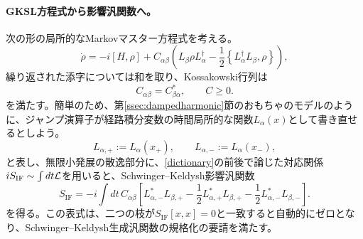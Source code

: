 \documentclass[a4paper,11pt,oneside]{article}
\theoremstyle{definition}
\numberwithin{equation}{section}
\renewcommand{\L}{\mathcal{L}}
\begin{document}
\paragraph{GKSL方程式から影響汎関数へ。}
次の形の局所的なMarkovマスター方程式を考える。
\begin{equation}
\dot{\rho}
=
-i[H,\rho]
+
C_{\alpha\beta}
\left(
L_{\beta}\rho L_{\alpha}^{\dagger}
-
\frac{1}{2}
\left\{
L_{\alpha}^{\dagger}L_{\beta},
\rho
\right\}
\right),
\end{equation}
繰り返された添字については和を取り、Kossakowski行列は
\begin{equation}\label{Cprop}
C_{\alpha\beta}
=
C_{\beta\alpha}^{*},
\qquad
C\geq 0.
\end{equation}
を満たす。簡単のため、第\ref{ssec:dampedharmonic}節のおもちゃのモデルのように、ジャンプ演算子が経路積分変数の時間局所的な関数$L_{\alpha}(x)$として書き直せるとしよう。
\begin{equation}
L_{\alpha,+}
:=
L_{\alpha}(x_{+}),
\qquad
L_{\alpha,-}
:=
L_{\alpha}(x_{-}),
\end{equation}
と表し、無限小発展の散逸部分に、\eqref{dictionary}の前後で論じた対応関係$ iS_{\rm IF} \sim \int dt \L  $を用いると、Schwinger--Keldysh影響汎関数
\begin{equation}
S_{\mathrm{IF}}
=
-i
\int dt\,
C_{\alpha\beta}
\left[
L_{\alpha,-}^{*}L_{\beta,+}
-
\frac{1}{2}
L_{\alpha,+}^{*}L_{\beta,+}
-
\frac{1}{2}
L_{\alpha,-}^{*}L_{\beta,-}
\right].
\end{equation}
を得る。この表式は、二つの枝が\( S_{\mathrm{IF}}[x,x]
=
0 \)と一致すると自動的にゼロとなり、Schwinger--Keldysh生成汎関数の規格化の要請を満たす。
\end{document}
